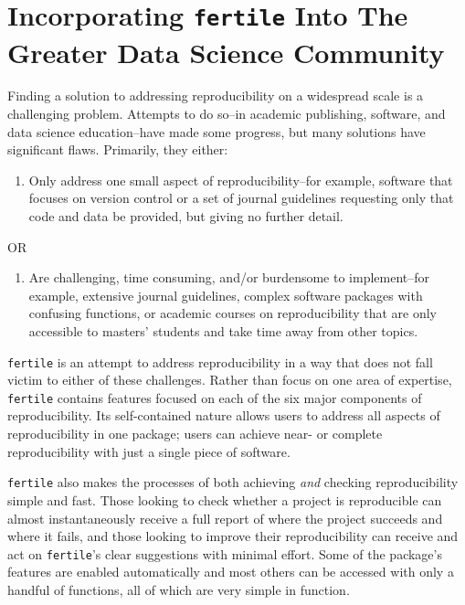 \documentclass[12pt,twoside]{reedthesis}
\providecommand{\tightlist}{%
  \setlength{\itemsep}{0pt}\setlength{\parskip}{0pt}}
\begin{document}
\hypertarget{applications}{%
\chapter{\texorpdfstring{Incorporating \texttt{fertile} Into The Greater Data Science Community}{Incorporating fertile Into The Greater Data Science Community}}\label{applications}}

Finding a solution to addressing reproducibility on a widespread scale is a challenging problem. Attempts to do so--in academic publishing, software, and data science education--have made some progress, but many solutions have significant flaws. Primarily, they either:
\begin{enumerate}
\def\labelenumi{\Alph{enumi})}
\tightlist
\item
  Only address one small aspect of reproducibility--for example, software that focuses on version control or a set of journal guidelines requesting only that code and data be provided, but giving no further detail.
\end{enumerate}
\begin{center}
OR
\end{center}
\begin{enumerate}
\def\labelenumi{\Alph{enumi})}
\setcounter{enumi}{1}
\tightlist
\item
  Are challenging, time consuming, and/or burdensome to implement--for example, extensive journal guidelines, complex software packages with confusing functions, or academic courses on reproducibility that are only accessible to masters' students and take time away from other topics.
\end{enumerate}
\texttt{fertile} is an attempt to address reproducibility in a way that does not fall victim to either of these challenges. Rather than focus on one area of expertise, \texttt{fertile} contains features focused on each of the six major components of reproducibility. Its self-contained nature allows users to address all aspects of reproducibility in one package; users can achieve near- or complete reproducibility with just a single piece of software.

\texttt{fertile} also makes the processes of both achieving \emph{and} checking reproducibility simple and fast. Those looking to check whether a project is reproducible can almost instantaneously receive a full report of where the project succeeds and where it fails, and those looking to improve their reproducibility can receive and act on \texttt{fertile}'s clear suggestions with minimal effort. Some of the package's features are enabled automatically and most others can be accessed with only a handful of functions, all of which are very simple in function.
\end{document}
